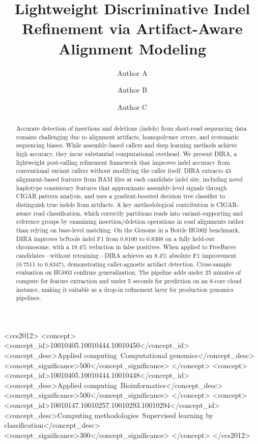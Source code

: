 \documentclass[sigconf]{acmart}
\begin{document}
\title{Lightweight Discriminative Indel Refinement via Artifact-Aware Alignment Modeling}

\author{Author A}

\author{Author B}
\authornotemark[1]

\author{Author C}
\authornotemark[1]

\renewcommand{\shortauthors}{Author A et al.}

\begin{abstract}
Accurate detection of insertions and deletions (indels) from short-read sequencing data remains challenging due to alignment artifacts, homopolymer errors, and systematic sequencing biases. While assembly-based callers and deep learning methods achieve high accuracy, they incur substantial computational overhead. We present DIRA, a lightweight post-calling refinement framework that improves indel accuracy from conventional variant callers without modifying the caller itself. DIRA extracts 43 alignment-based features from BAM files at each candidate indel site, including novel haplotype consistency features that approximate assembly-level signals through CIGAR pattern analysis, and uses a gradient-boosted decision tree classifier to distinguish true indels from artifacts. A key methodological contribution is CIGAR-aware read classification, which correctly partitions reads into variant-supporting and reference groups by examining insertion/deletion operations in read alignments rather than relying on base-level matching. On the Genome in a Bottle HG002 benchmark, DIRA improves bcftools indel F1 from 0.8100 to 0.8308 on a fully held-out chromosome, with a 19.4\% reduction in false positives. When applied to FreeBayes candidates---without retraining---DIRA achieves an 8.4\% absolute F1 improvement (0.7511 to 0.8347), demonstrating caller-agnostic artifact detection. Cross-sample evaluation on HG003 confirms generalization. The pipeline adds under 25 minutes of compute for feature extraction and under 5 seconds for prediction on an 8-core cloud instance, making it suitable as a drop-in refinement layer for production genomics pipelines.
\end{abstract}

\begin{CCSXML}
<ccs2012>
 <concept>
  <concept_id>10010405.10010444.10010450</concept_id>
  <concept_desc>Applied computing~Computational genomics</concept_desc>
  <concept_significance>500</concept_significance>
 </concept>
 <concept>
  <concept_id>10010405.10010444.10010448</concept_id>
  <concept_desc>Applied computing~Bioinformatics</concept_desc>
  <concept_significance>500</concept_significance>
 </concept>
 <concept>
  <concept_id>10010147.10010257.10010293.10010294</concept_id>
  <concept_desc>Computing methodologies~Supervised learning by classification</concept_desc>
  <concept_significance>300</concept_significance>
 </concept>
</ccs2012>
\end{CCSXML}
\end{document}
